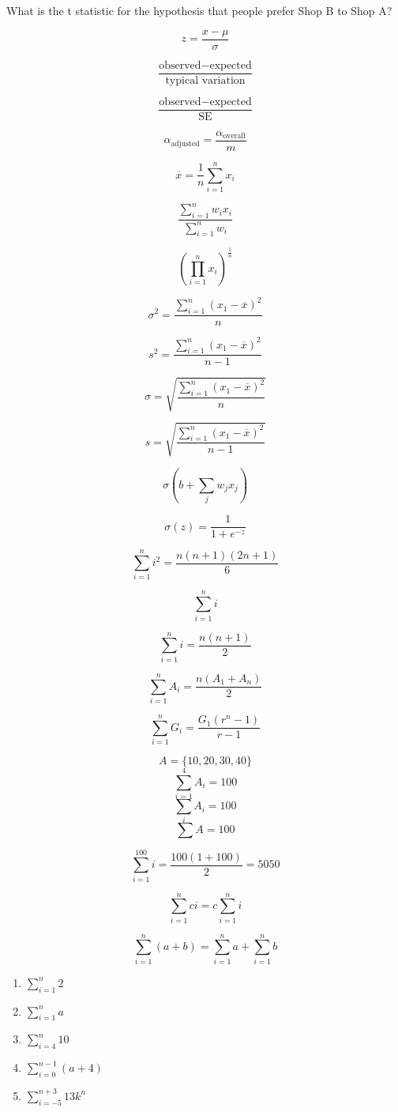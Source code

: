 \documentclass[twocolumn]{article}
\begin{document}
What is the t statistic for the hypothesis that people prefer Shop B to Shop A?

\clearpage

$$ z = \frac{x - \mu}{\sigma} $$


$$ \frac{\text{observed} - \text{expected}}{\text{typical variation}} $$

$$ \frac{\text{observed} - \text{expected}}{\text{SE}} $$


$$ \alpha_{\text{adjusted}} = \frac{\alpha_{\text{overall}}}{m} $$

$$ \overline{x} = \frac{1}{n}\sum_{i=1}^{n} x_i $$

$$ \frac{\sum_{i=1}^{n} w_ix_i}{\sum_{i=1}^{n} w_i} $$

$$ \left( \prod_{i=1}^{n} x_i \right) ^{\frac{1}{n}} $$

$$ \sigma^2 = \frac{\sum_{i=1}^{n} (x_1 - \overline{x})^2}{n} $$

$$ s^2 = \frac{\sum_{i=1}^{n} (x_1 - \overline{x})^2}{n-1} $$

$$ \sigma = \sqrt{\frac{\sum_{i=1}^{n} (x_1 - \overline{x})^2}{n}} $$

$$ s = \sqrt{\frac{\sum_{i=1}^{n} (x_1 - \overline{x})^2}{n-1}} $$

$$ \sigma(b + \sum_j w_j x_j) $$

$$\sigma(z) = \frac{1}{1 + e^{-z}}$$

\iffalse
\clearpage

$$ \sum_{i=1}^{n} i^2 = \frac{n(n+1)(2n + 1)}{6} $$

$$ \sum_{i=1}^{n} i $$

$$ \sum_{i=1}^{n} i = \frac{n(n + 1)}{2} $$

$$ \sum_{i=1}^{n} A_i = \frac{n(A_1 + A_n)}{2} $$

$$ \sum_{i=1}^{n} G_i = \frac{G_1(r^n - 1)}{r -1} $$


$$ A = \{ 10, 20, 30, 40 \}$$
$$ \sum_{i=1}^{4} A_i = 100$$
$$ \sum_i A_i = 100$$
$$ \sum A = 100$$

$$ \sum_{i=1}^{100} i = \frac{100(1 + 100)}{2} = 5050$$






$$ \sum_{i=1}^{n} ci = c \sum_{i=1}^{n} i $$

$$ \sum_{i=1}^{n} (a + b) = \sum_{i=1}^{n} a + \sum_{i=1}^{n} b $$

\begin{enumerate}
    \item $ \sum_{i=1}^{n} 2 $

    \item $ \sum_{i=1}^{n} a $

    \item $ \sum_{i=4}^{n} 10 $

    \item $ \sum_{i=0}^{n-1} (a + 4) $

    \item $ \sum_{i=-5}^{n+3} 13k^n$
\end{enumerate}
\end{document}
